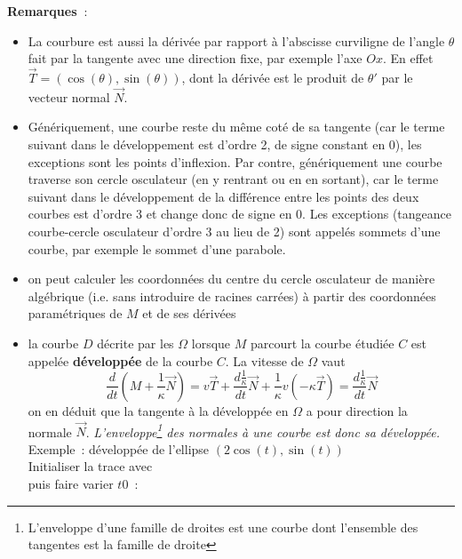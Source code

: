 \documentclass[a4paper,11pt]{article}
\begin{document}
\begin{giacjshere}
{\bf Remarques~}: 
\begin{itemize}
\item La courbure est aussi la d\'eriv\'ee par
rapport \`a l'abscisse curviligne de 
l'angle $\theta$ fait par la
  tangente avec une direction fixe, par exemple l'axe $Ox$.
En effet $\vec{T}=(\cos(\theta),\sin(\theta))$,
dont la d\'eriv\'ee est le produit de $\theta'$ par le vecteur
normal $\vec{N}$.
\item G\'en\'eriquement, une courbe reste du m\^eme cot\'e de
sa tangente (car le terme suivant dans le d\'eveloppement est d'ordre
2, de signe constant en 0), les exceptions sont les points
d'inflexion. Par contre,
g\'en\'eriquement une courbe traverse son cercle osculateur (en y
rentrant ou en en sortant), car le terme suivant dans le
d\'eveloppement de la diff\'erence entre les points des deux courbes 
est d'ordre 3 et change donc de signe en 0. Les exceptions
(tangeance courbe-cercle osculateur d'ordre 3 au lieu de 2)
sont appel\'es sommets d'une courbe, par exemple le sommet d'une
parabole.
\item on peut calculer les coordonn\'ees du centre du cercle
osculateur de mani\`ere alg\'ebrique (i.e. sans introduire de racines
carr\'ees) \`a partir des
coordonn\'ees param\'etriques de $M$ et de ses d\'eriv\'ees
\item la courbe $D$ d\'ecrite par les $\Omega$ lorsque $M$ parcourt
la courbe \'etudi\'ee $C$ est appel\'ee
{\bf d\'evelopp\'ee} 
de la courbe $C$. 
La vitesse de $\Omega$ vaut
$$ \frac{d}{dt}(M+\frac1\kappa \vec{N})=v\vec{T} +
\frac{d\frac1\kappa}{dt} \vec{N} + \frac1\kappa v(-\kappa
\vec{T})
= \frac{d\frac1\kappa}{dt} \vec{N} $$
on en d\'eduit que la tangente \`a la d\'evelopp\'ee en $\Omega$ a
pour direction la normale $\vec{N}$. 
{\em L'enveloppe\footnote{L'enveloppe d'une famille
de droites est une courbe dont l'ensemble des tangentes est la famille de droite} 
des normales \`a une courbe est donc sa d\'evelopp\'ee.}\\
Exemple~: d\'evelopp\'ee de l'ellipse $(2\cos(t),\sin(t))$\\
Initialiser la trace avec \\
puis faire varier $t0$~:

\end{itemize}
\end{giacjshere}
\end{document}
